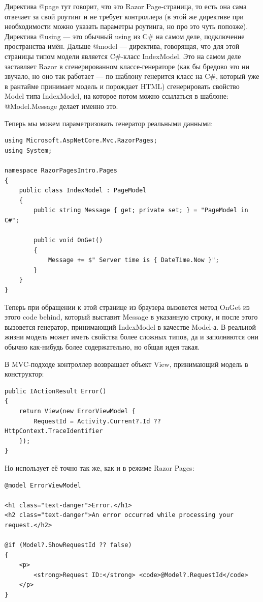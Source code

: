 \documentclass[a5paper]{article}
\begin{document}
Директива @page тут говорит, что это Razor Page-страница, то есть она сама отвечает за свой роутинг и не требует контроллера (в этой же директиве при необходимости можно указать параметры роутинга, но про это чуть попозже). Директива @using --- это обычный using из C\# на самом деле, подключение пространства имён. Дальше @model --- директива, говорящая, что для этой страницы типом модели является C\#-класс IndexModel. Это на самом деле заставляет Razor в сгенерированном классе-генераторе (как бы бредово это ни звучало, но оно так работает --- по шаблону генерится класс на C\#, который уже в рантайме принимает модель и порождает HTML) сгенерировать свойство Model типа IndexModel, на которое потом можно ссылаться в шаблоне: @Model.Message делает именно это.

Теперь мы можем параметризовать генератор реальными данными:

\begin{verbatim}
using Microsoft.AspNetCore.Mvc.RazorPages;
using System;

namespace RazorPagesIntro.Pages
{
    public class IndexModel : PageModel
    {
        public string Message { get; private set; } = "PageModel in C#";

        public void OnGet()
        {
            Message += $" Server time is { DateTime.Now }";
        }
    }
}
\end{verbatim}

Теперь при обращении к этой странице из браузера вызовется метод OnGet из этого code behind, который выставит Message в указанную строку, и после этого вызовется генератор, принимающий IndexModel в качестве Model-а. В реальной жизни модель может иметь свойства более сложных типов, да и заполняются они обычно как-нибудь более содержательно, но общая идея такая. 

В MVC-подходе контроллер возвращает объект View, принимающий модель в конструктор:

\begin{verbatim}
public IActionResult Error()
{
    return View(new ErrorViewModel { 
        RequestId = Activity.Current?.Id ?? HttpContext.TraceIdentifier 
    });
}
\end{verbatim}

Но использует её точно так же, как и в режиме Razor Pages:

\begin{verbatim}
@model ErrorViewModel

<h1 class="text-danger">Error.</h1>
<h2 class="text-danger">An error occurred while processing your request.</h2>

@if (Model?.ShowRequestId ?? false)
{
    <p>
        <strong>Request ID:</strong> <code>@Model?.RequestId</code>
    </p>
}
\end{verbatim}
\end{document}

